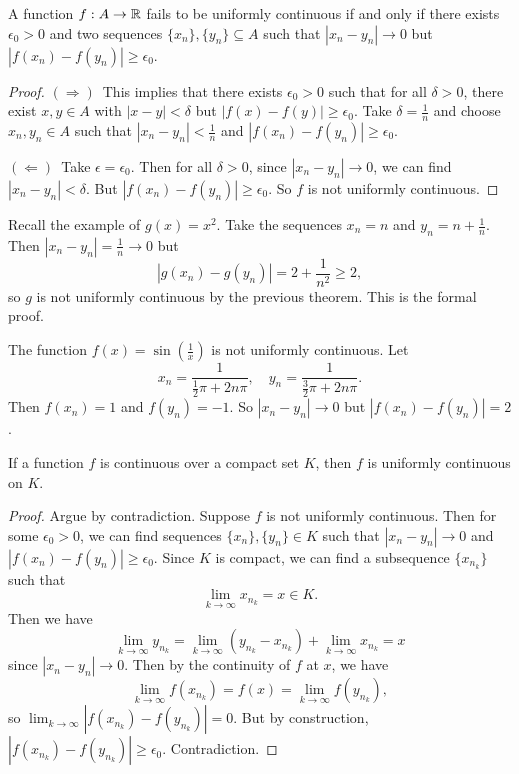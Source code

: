 \begin{theorem}
  A function $f : A \to \mathbb{R}$ fails to be uniformly
  continuous if and only if there exists $\epsilon_0 > 0$
  and two sequences $\{x_n\}, \{y_n\} \subseteq A$ such
  that $|x_n - y_n| \to 0$ but
  $|f(x_n) - f(y_n)| \ge \epsilon_0$.
\end{theorem}

\begin{proof}
  $(\Rightarrow)$\, This implies that there exists
  $\epsilon_0 > 0$ such that for all $\delta > 0$,
  there exist $x, y \in A$ with $|x - y| < \delta$ but
  $|f(x) - f(y)| \ge \epsilon_0$. Take
  $\delta = \frac{1}{n}$
  and choose $x_n, y_n \in A$ such that
  $|x_n - y_n| < \frac{1}{n}$ and
  $|f(x_n) - f(y_n)| \ge \epsilon_0$.

  $(\Leftarrow)$\, Take $\epsilon = \epsilon_0$. Then
  for all $\delta > 0$, since $|x_n - y_n| \to 0$,
  we can find $|x_n - y_n| < \delta$. But
  $|f(x_n) - f(y_n)| \ge \epsilon_0$. So $f$ is
  not uniformly continuous.
\end{proof}

\begin{example}
  Recall the example of $g(x) = x^2$. Take the
  sequences $x_n = n$ and $y_n = n + \frac{1}{n}$.
  Then $|x_n - y_n| = \frac{1}{n} \to 0$ but
  \[|g(x_n) - g(y_n)| = 2 + \frac{1}{n^2} \ge 2,\]
  so $g$ is not uniformly continuous by the previous
  theorem. This is the formal proof.
\end{example}

\begin{example}
  The function $f(x) = \sin(\frac{1}{x})$ is not
  uniformly continuous. Let
  \[x_n = \frac{1}{\frac{1}{2}\pi + 2n\pi}, \quad y_n = \frac{1}{\frac{3}{2}\pi + 2n \pi}.\]
  Then $f(x_n) = 1$ and $f(y_n) = -1$. So
  $|x_n - y_n| \to 0$ but
  $|f(x_n) - f(y_n)| = 2$.
\end{example}

\begin{theorem}
  If a function $f$ is continuous over a compact set
  $K$, then $f$ is uniformly continuous on $K$.
\end{theorem}

\begin{proof}
  Argue by contradiction. Suppose $f$ is not uniformly
  continuous. Then for some $\epsilon_0 > 0$, we can find
  sequences
  $\{x_n\}, \{y_n\} \in K$ such that
  $|x_n - y_n| \to 0$ and
  $|f(x_n) - f(y_n)| \ge \epsilon_0$. Since $K$ is compact,
  we can find a subsequence $\{x_{n_k}\}$ such that
  \[
    \lim_{k \to \infty} x_{n_k} = x \in K
  .\]
  Then we have
  \[\lim_{k \to \infty} y_{n_k} = \lim_{k \to \infty}(y_{n_k} - x_{n_k}) + \lim_{k \to \infty} x_{n_k} = x\]
  since $|x_n - y_n| \to 0$. Then by the continuity
  of $f$ at $x$, we have
  \[\lim_{k \to \infty} f(x_{n_k}) = f(x) = \lim_{k \to \infty} f(y_{n_k}),\]
  so $\lim_{k \to \infty} |f(x_{n_k}) - f(y_{n_k})| = 0$.
  But by construction,
  $|f(x_{n_k}) - f(y_{n_k})| \ge \epsilon_0$.
  Contradiction.
\end{proof}

